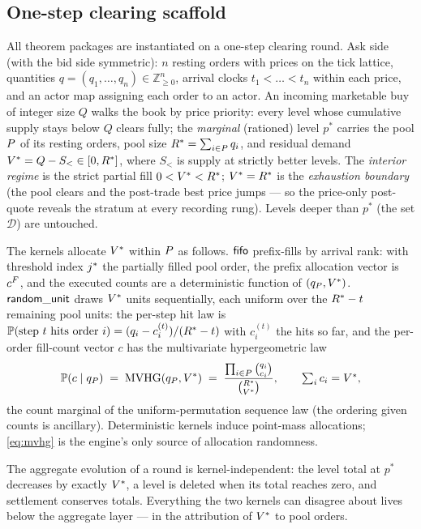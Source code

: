 \subsection{One-step clearing scaffold}
\label{sec:scaffold}

All theorem packages are instantiated on a one-step clearing round. Ask side
(with the bid side symmetric): $n$ resting orders with prices on the tick
lattice, quantities $q = (q_1,\dots,q_n) \in \mathbb{Z}_{\geq 0}^n$, arrival
clocks $t_1 < \dots < t_n$ within each price, and an actor map assigning each
order to an actor. An incoming marketable buy of integer size $Q$ walks the
book by price priority: every level whose cumulative supply stays below $Q$
clears fully; the \emph{marginal} (rationed) level $p^{*}$ carries the pool
$P$ of its resting orders, pool size $R^{*} = \sum_{i \in P} q_i$,
and residual demand $V^{*} = Q - S_{<} \in [0,R^{*}]$, where $S_{<}$ is
supply at strictly better levels. The \emph{interior regime} is the strict
partial fill $0 < V^{*} < R^{*}$; $V^{*} = R^{*}$ is the
\emph{exhaustion boundary} (the pool clears and the post-trade best price
jumps --- so the price-only post-quote reveals the stratum at every recording
rung). Levels deeper than $p^{*}$ (the set $\mathcal{D}$) are untouched.

The kernels allocate $V^{*}$ within $P$ as follows. $\mathsf{fifo}$
prefix-fills by arrival rank: with threshold index $j^{*}$ the partially
filled pool order, the prefix allocation vector is $c^{F}$, and the executed
counts are a deterministic function of $(q_{P}, V^{*})$. $\mathsf{random\_unit}$ draws $V^{*}$
units sequentially, each uniform over the $R^{*} - t$ remaining pool units:
the per-step hit law is
$\mathbb{P}(\text{step } t \text{ hits order } i) =
(q_i - c_i^{(t)})/(R^{*} - t)$ with $c_i^{(t)}$ the hits so far, and the
per-order fill-count vector $c$ has the multivariate hypergeometric law
\begin{equation}
\label{eq:mvhg}
\mathbb{P}(c \mid q_{P}) \;=\; \operatorname{MVHG}(q_{P},V^{*})
\;=\; \frac{\prod_{i \in P} \binom{q_i}{c_i}}
{\binom{R^{*}}{V^{*}}},
\qquad \textstyle\sum_i c_i = V^{*} ,
\end{equation}
the count marginal of the uniform-permutation sequence law (the ordering
given counts is ancillary). Deterministic kernels induce point-mass
allocations; \eqref{eq:mvhg} is the engine's only source of allocation
randomness.

The aggregate evolution of a round is kernel-independent: the level total at
$p^{*}$ decreases by exactly $V^{*}$, a level is deleted when its total
reaches zero, and settlement conserves totals. Everything the two kernels can
disagree about lives below the aggregate layer --- in the attribution of
$V^{*}$ to pool orders.

